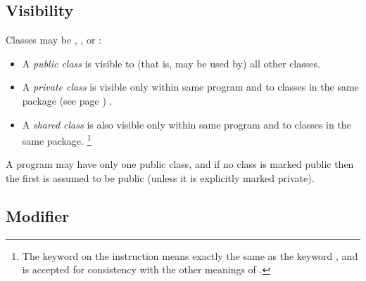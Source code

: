 \subsection{Visibility}
 
Classes may be , , or
:
\begin{itemize}
\item A \emph{public class} is visible to (that is, may be used by)
all other classes.
\item A \emph{private class} is visible only within same program and to
classes in the same  package (see page \pageref{refpackage}) .
\item A \emph{shared class} is also visible only within same program and to
classes in the same package.
\footnote{
The  keyword on the  instruction means
exactly the same as the keyword , and is accepted for
consistency with the other meanings of .
}
\end{itemize}
\begin{shaded} 
A program may have only one public class, and if no class is marked
public then the first is assumed to be public (unless it is explicitly
marked private).
\end{shaded}
\subsection{Modifier}
 
